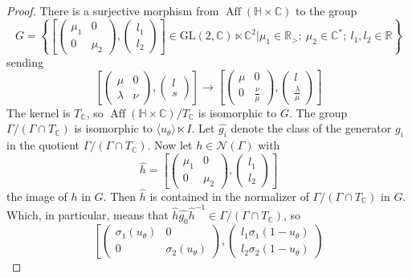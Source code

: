 \documentclass[10pt,a4paper]{amsart}
\DeclareMathOperator{\Aff}{Aff}
\newcommand{\C}{\mathbb{C}}
\newcommand{\HH}{\mathbb{H}}
\newcommand{\Nc}{\mathcal{N}}
\newcommand{\R}{\mathbb{R}}
\begin{document}
\begin{proof}
There is a surjective morphism from $\Aff(\HH \times \C)$ to the group
$$G=
\left\{
\left[
\begin{pmatrix}
\mu_1 & 0\\
0 & \mu_2
\end{pmatrix},
\begin{pmatrix}
l_1 \\
l_2
\end{pmatrix}
\right] \in \text{GL}(2, \C) \ltimes \C^2\vert \mu_1\in \R_>;\  \mu_2\in \C^*;\  l_1, l_2 \in \R \right\}$$
sending
$$\left[
\begin{pmatrix}
\mu & 0\\
\lambda & \nu
\end{pmatrix},
\begin{pmatrix}
l \\
s
\end{pmatrix}
\right] \to
\left[
\begin{pmatrix}
\mu & 0\\
0 & \frac{\nu}{\mu}
\end{pmatrix},
\begin{pmatrix}
l \\
\frac{\lambda}{\mu}
\end{pmatrix}
\right]
$$
The kernel is $T_\C$, so $\Aff(\HH \times \C)/T_\C$ is isomorphic to $G$. The group $\Gamma/(\Gamma \cap T_\C)$ is isomorphic to $\langle u_\theta \rangle \ltimes I$. Let $\hat{g_i}$ denote the class of the generator $g_i$ in the quotient $\Gamma / (\Gamma \cap T_\C)$. Now let $h \in \Nc(\Gamma)$ with 
$$\hat{h} =
\left[
\begin{pmatrix}
\mu_1 & 0\\
0 & \mu_2
\end{pmatrix},
\begin{pmatrix}
l_1 \\
l_2
\end{pmatrix}
\right]
$$
the image of $h$ in $G$. Then $\hat{h}$ is contained in the normalizer of $\Gamma/(\Gamma \cap T_\C)$ in $G$. Which, in particular, means that $\hat{h}\hat{g_0}\hat{h}^{-1} \in \Gamma/(\Gamma\cap T_\C)$, so 
$$\left[
\begin{pmatrix}
\sigma_1(u_\theta) & 0\\
0 & \sigma_2(u_\theta)
\end{pmatrix},
\begin{pmatrix}
l_1\sigma_1(1-u_\theta) \\
l_2\sigma_2(1-u_\theta)
\end{pmatrix}
$$
\end{proof}
\end{document}
